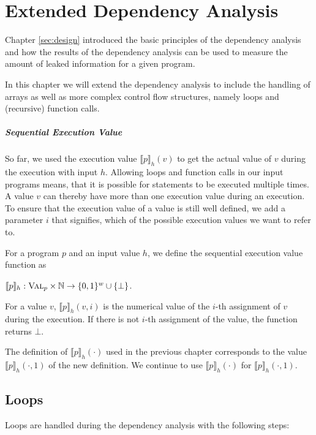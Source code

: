 \chapter{Extended Dependency Analysis}\label{ch:loops}

Chapter \ref{sec:design} introduced the basic principles of the dependency analysis and how the results of the dependency analysis can be used to measure the amount of leaked information for a given program.

In this chapter we will extend the dependency analysis to include the handling of arrays as well as more complex control flow structures, namely loops and (recursive) function calls.

\paragraph{Sequential Execution Value}
So far, we used the execution value $\llbracket p \rrbracket_h (v)$ to get the actual value of $v$ during the execution with input $h$. Allowing loops and function calls in our input programs means, that it is possible for statements to be executed multiple times. A value $v$ can thereby have more than one execution value during an execution.
To ensure that the execution value of a value is still well defined, we add a parameter $i$ that signifies, which of the possible execution values we want to refer to.

\begin{definition}
    For a program $p$ and an input value $h$, we define the sequential execution value function as
    \begin{center}
        $\llbracket p \rrbracket_h: \textsc{Val}_p \times \mathbb{N} \to \{0, 1\} ^w \cup \{\bot\}$.
    \end{center}
    For a value $v$, $\llbracket p \rrbracket_h(v, i)$ is the numerical value of the $i$-th assignment of $v$ during the execution. If there is not $i$-th assignment of the value, the function returns $\bot$.
\end{definition}
The definition of $\llbracket p \rrbracket_h(\cdot)$ used in the previous chapter corresponds to the value $\llbracket p \rrbracket_h (\cdot, 1)$ of the new definition. We continue to use $\llbracket p \rrbracket_h(\cdot)$ for $\llbracket p \rrbracket_h (\cdot, 1)$. 

\section{Loops}
Loops are handled during the dependency analysis with the following steps:

